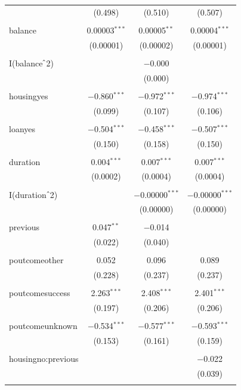 \documentclass[11pt]{article}
\begin{document}
{\begin{table}[H]
{\begin{tabular}{@{\extracolsep{5pt}}lccc}
  & (0.498) & (0.510) & (0.507) \\ 
  & & & \\ 
 balance & 0.00003$^{***}$ & 0.00005$^{**}$ & 0.00004$^{***}$ \\ 
  & (0.00001) & (0.00002) & (0.00001) \\ 
  & & & \\ 
 I(balance$\hat{\mkern6mu}$2) &  & $-$0.000 &  \\ 
  &  & (0.000) &  \\ 
  & & & \\ 
 housingyes & $-$0.860$^{***}$ & $-$0.972$^{***}$ & $-$0.974$^{***}$ \\ 
  & (0.099) & (0.107) & (0.106) \\ 
  & & & \\ 
 loanyes & $-$0.504$^{***}$ & $-$0.458$^{***}$ & $-$0.507$^{***}$ \\ 
  & (0.150) & (0.158) & (0.150) \\ 
  & & & \\ 
 duration & 0.004$^{***}$ & 0.007$^{***}$ & 0.007$^{***}$ \\ 
  & (0.0002) & (0.0004) & (0.0004) \\ 
  & & & \\ 
 I(duration$\hat{\mkern6mu}$2) &  & $-$0.00000$^{***}$ & $-$0.00000$^{***}$ \\ 
  &  & (0.00000) & (0.00000) \\ 
  & & & \\ 
 previous & 0.047$^{**}$ & $-$0.014 &  \\ 
  & (0.022) & (0.040) &  \\ 
  & & & \\ 
 poutcomeother & 0.052 & 0.096 & 0.089 \\ 
  & (0.228) & (0.237) & (0.237) \\ 
  & & & \\ 
 poutcomesuccess & 2.263$^{***}$ & 2.408$^{***}$ & 2.401$^{***}$ \\ 
  & (0.197) & (0.206) & (0.206) \\ 
  & & & \\ 
 poutcomeunknown & $-$0.534$^{***}$ & $-$0.577$^{***}$ & $-$0.593$^{***}$ \\ 
  & (0.153) & (0.161) & (0.159) \\ 
  & & & \\ 
 housingno:previous &  &  & $-$0.022 \\ 
  &  &  & (0.039) \\ 
  & & & \\ 

\end{tabular}}
\end{table}}
\end{document}
